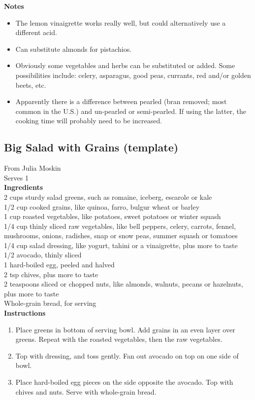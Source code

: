 \documentclass{article}
\numberwithin{figure}{section}
\numberwithin{equation}{section}
\begin{document}
{\bf Notes}
\begin{itemize}
\item The lemon vinaigrette works really well, but could alternatively use a different acid.
\item Can substitute almonds for pistachios.
\item Obviously some vegetables and herbs can be substituted or added. Some possibilities include: celery, asparagus, good peas, currants, red and/or golden beets, etc.
\item Apparently there is a difference between pearled (bran removed; most common in the U.S.) and un-pearled or semi-pearled. If using the latter, the cooking time will probably need to be increased.
\end{itemize}




\pagebreak
\subsection{Big Salad with Grains (template)}
From Julia Moskin\\

Serves 1\\

{\bf Ingredients}\\
2 cups sturdy salad greens, such as romaine, iceberg, escarole or kale\\
1/2 cup cooked grains, like quinoa, farro, bulgur wheat or barley\\
1 cup roasted vegetables, like potatoes, sweet potatoes or winter squash\\
1/4 cup thinly sliced raw vegetables, like bell peppers, celery, carrots, fennel, mushrooms, onions, radishes, snap or snow peas, summer squash or tomatoes\\
1/4 cup salad dressing, like yogurt, tahini or a vinaigrette, plus more to taste\\
1/2 avocado, thinly sliced\\
1 hard-boiled egg, peeled and halved\\
2 tsp chives, plus more to taste\\
2 teaspoons sliced or chopped nuts, like almonds, walnuts, pecans or hazelnuts, plus more to taste\\
Whole-grain bread, for serving\\

{\bf Instructions}
\begin{enumerate}
\item Place greens in bottom of serving bowl. Add grains in an even layer over greens. Repeat with the roasted vegetables, then the raw vegetables.
\item Top with dressing, and toss gently. Fan out avocado on top on one side of bowl.
\item Place hard-boiled egg pieces on the side opposite the avocado. Top with chives and nuts. Serve with whole-grain bread.
\end{enumerate}
\end{document}
